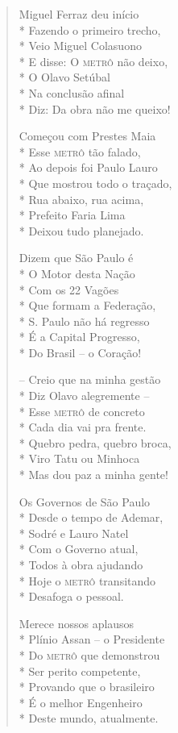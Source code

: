 \begin{verse}
Miguel Ferraz deu início\\*
Fazendo o primeiro trecho,\\*
Veio Miguel Colasuono\\*
E disse: O \textsc{metrô} não deixo,\\*
O Olavo Setúbal\\*
Na conclusão afinal\\*
Diz: Da obra não me queixo!

Começou com Prestes Maia\\*
Esse \textsc{metrô} tão falado,\\*
Ao depois foi Paulo Lauro\\*
Que mostrou todo o traçado,\\*
Rua abaixo, rua acima,\\*
Prefeito Faria Lima\\*
Deixou tudo planejado.

Dizem que São Paulo é\\*
O Motor desta Nação\\*
Com os 22 Vagões\\*
Que formam a Federação,\\*
S. Paulo não há regresso\\*
É a Capital Progresso,\\*
Do Brasil --  o Coração!

--  Creio que na minha gestão\\*
Diz Olavo alegremente --\\*
Esse \textsc{metrô} de concreto\\*
Cada dia vai pra frente.\\*
Quebro pedra, quebro broca,\\*
Viro Tatu ou Minhoca\\*
Mas dou paz a minha gente!

Os Governos de São Paulo\\*
Desde o tempo de Ademar,\\*
Sodré e Lauro Natel\\*
Com o Governo atual,\\*
Todos à obra ajudando\\*
Hoje o \textsc{metrô} transitando\\*
Desafoga o pessoal.

Merece nossos aplausos\\*
Plínio Assan --  o Presidente\\*
Do \textsc{metrô} que demonstrou\\*
Ser perito competente,\\*
Provando que o brasileiro\\*
É o melhor Engenheiro\\*
Deste mundo, atualmente.


\end{verse}
